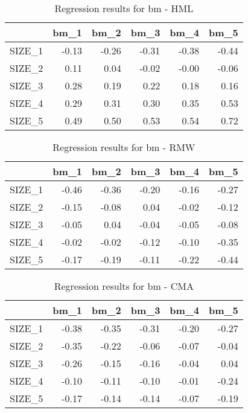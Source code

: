 \begin{table}[ht]
\centering
\caption{Regression results for bm - HML} 
\begin{tabular}{rrrrrr}
  \hline
 & bm\_1 & bm\_2 & bm\_3 & bm\_4 & bm\_5 \\ 
  \hline
SIZE\_1 & -0.13 & -0.26 & -0.31 & -0.38 & -0.44 \\ 
  SIZE\_2 & 0.11 & 0.04 & -0.02 & -0.00 & -0.06 \\ 
  SIZE\_3 & 0.28 & 0.19 & 0.22 & 0.18 & 0.16 \\ 
  SIZE\_4 & 0.29 & 0.31 & 0.30 & 0.35 & 0.53 \\ 
  SIZE\_5 & 0.49 & 0.50 & 0.53 & 0.54 & 0.72 \\ 
   \hline
\end{tabular}
\end{table}


\begin{table}[ht]
\centering
\caption{Regression results for bm - RMW} 
\begin{tabular}{rrrrrr}
  \hline
 & bm\_1 & bm\_2 & bm\_3 & bm\_4 & bm\_5 \\ 
  \hline
SIZE\_1 & -0.46 & -0.36 & -0.20 & -0.16 & -0.27 \\ 
  SIZE\_2 & -0.15 & -0.08 & 0.04 & -0.02 & -0.12 \\ 
  SIZE\_3 & -0.05 & 0.04 & -0.04 & -0.05 & -0.08 \\ 
  SIZE\_4 & -0.02 & -0.02 & -0.12 & -0.10 & -0.35 \\ 
  SIZE\_5 & -0.17 & -0.19 & -0.11 & -0.22 & -0.44 \\ 
   \hline
\end{tabular}
\end{table}


\begin{table}[ht]
\centering
\caption{Regression results for bm - CMA} 
\begin{tabular}{rrrrrr}
  \hline
 & bm\_1 & bm\_2 & bm\_3 & bm\_4 & bm\_5 \\ 
  \hline
SIZE\_1 & -0.38 & -0.35 & -0.31 & -0.20 & -0.27 \\ 
  SIZE\_2 & -0.35 & -0.22 & -0.06 & -0.07 & -0.04 \\ 
  SIZE\_3 & -0.26 & -0.15 & -0.16 & -0.04 & 0.04 \\ 
  SIZE\_4 & -0.10 & -0.11 & -0.10 & -0.01 & -0.24 \\ 
  SIZE\_5 & -0.17 & -0.14 & -0.14 & -0.07 & -0.19 \\ 
   \hline
\end{tabular}
\end{table}


